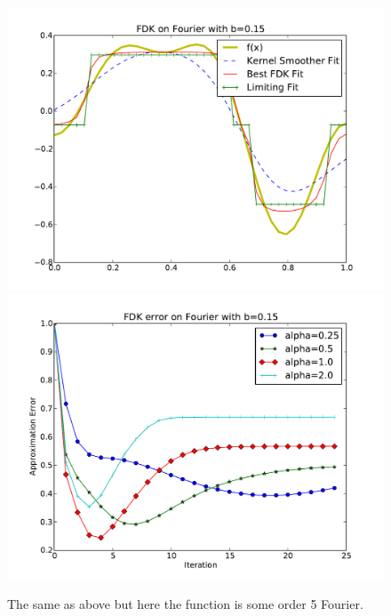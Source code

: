 \begin{figure}[!htb]
    \includegraphics[width=\linewidth]{figs/chap4/bump15.pdf}
  \endminipage\hfill
    \includegraphics[width=\linewidth]{figs/chap4/bump15err.pdf}
  \endminipage
\caption[Fitting an order 5 Fourier function with $b = .15$]
{The same as above but here the function is some order 5 Fourier.}
\end{figure}


